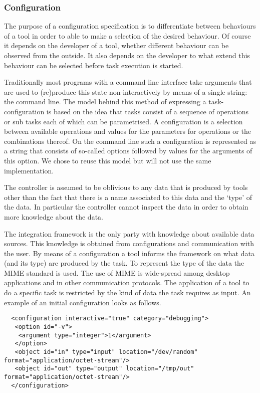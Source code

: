 \documentclass{article}
\begin{document}
  \subsubsection{Configuration} \label{ss:implementation_configuration}

   The purpose of a configuration specification is to differentiate between
   behaviours of a tool in order to able to make a selection of the desired
   behaviour. Of course it depends on the developer of a tool, whether
   different behaviour can be observed from the outside. It also depends on the
   developer to what extend this behaviour can be selected before task
   execution is started.

   Traditionally most programs with a command line interface take arguments
   that are used to (re)produce this state non-interactively by means of a
   single string: the command line. The model behind this method of expressing
   a task-configuration is based on the idea that tasks consist of a sequence
   of operations or sub tasks each of which can be parametrised.  A
   configuration is a selection between available operations and values for the
   parameters for operations or the combinations thereof. On the command line such a
   configuration is represented as a string that consists of so-called options
   followed by values for the arguments of this option. We chose to reuse this
   model but will not use the same implementation.

   The controller is assumed to be oblivious to any data that is produced by
   tools other than the fact that there is a name associated to this data and
   the `type' of the data.  In particular the controller cannot inspect the
   data in order to obtain more knowledge about the data.

   The integration framework is the only party with knowledge about available
   data sources. This knowledge is obtained from configurations and
   communication with the user. By means of a configuration a tool informs the
   framework on what data (and its type) are produced by the task. To represent
   the type of the data the MIME standard is used. The use of MIME is
   wide-spread among desktop applications and in other communication protocols.
   The application of a tool to do a specific task is restricted by the kind of
   data the task requires as input. An example of an initial configuration
   looks as follows.

   \small \begin{verbatim}
  <configuration interactive="true" category="debugging">
   <option id="-v">
    <argument type="integer">1</argument>
   </option>
   <object id="in" type="input" location="/dev/random" format="application/octet-stream"/>
   <object id="out" type="output" location="/tmp/out" format="application/octet-stream"/>
  </configuration>\end{verbatim}
  \normalsize
\end{document}
